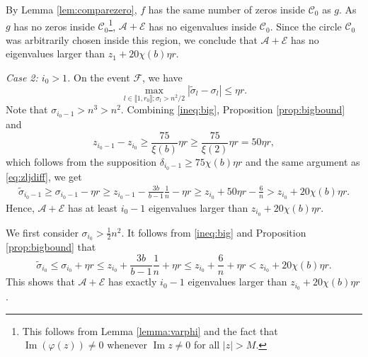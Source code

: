 \documentclass[reqno]{amsart}
\renewcommand\Im{\operatorname{Im}}
\theoremstyle{plain}
\theoremstyle{definition}
\begin{document}
By Lemma \ref{lem:comparezero}, $f$ has the same number of zeros inside $\mathcal{C}_0$ as $g$.  As $g$ has no zeros inside $\mathcal{C}_0$\footnote{This follows from Lemma \ref{lemma:varphi} and the fact that $\Im(\varphi(z)) \neq 0$ whenever $\Im z \neq 0$ for all $|z| > M$.}, $\mathcal A+\mathcal E$ has no eigenvalues inside $\mathcal{C}_0$.  Since the circle $\mathcal{C}_0$ was arbitrarily chosen inside this region, we conclude that $\mathcal A+\mathcal E$ has no eigenvalues larger than $z_1+20\chi(b)\eta r$.

\medskip

\noindent\emph{Case 2: $i_0>1$.} 
On the event $\mathcal F$, we have
\begin{equation}\label{ineq:big}
\max_{l\in \llbracket 1,r_0 \rrbracket; \sigma_l>n^2/2}|\widetilde \sigma_l - \sigma_l |\le \eta r.
\end{equation}
Note that $\sigma_{i_0-1}>n^3>n^2$.  Combining \eqref{ineq:big}, Proposition \ref{prop:bigbound} and $$z_{i_0-1} - z_{i_0}\ge \frac{75}{\xi(b)}\eta r\ge \frac{75}{\xi(2)}\eta r = 50\eta r,$$ which follows from the supposition $\delta_{i_0-1}\ge 75\chi(b) \eta r$ and the same argument as \eqref{eq:zljdiff}, we get 
\begin{align*}
\widetilde \sigma_{i_0-1} \ge \sigma_{i_0-1} - \eta r \ge z_{i_0-1} - \frac{3b}{b-1}\frac{1}{n} - \eta r \ge z_{i_0} + 50\eta r- \frac{6}{n} > z_{i_0} + 20\chi(b) \eta r.
\end{align*}
Hence, $\mathcal A+\mathcal E$ has at least $i_0-1$ eigenvalues larger than $z_{i_0}+20\chi(b)\eta r$. 

We first consider $\sigma_{i_0} >\frac{1}{2}n^2$.  It follows from \eqref{ineq:big} and Proposition \ref{prop:bigbound} that$$\widetilde \sigma_{i_0} \le \sigma_{i_0}+\eta r \le z_{i_0} + \frac{3b}{b-1}\frac{1}{n} +\eta r \le z_{i_0} +\frac{6}{n} +\eta r < z_{i_0} + 20\chi(b)\eta r.$$ This shows that $\mathcal A+\mathcal E$ has exactly $i_0-1$ eigenvalues larger than $z_{i_0}+20\chi(b)\eta r$. 
\end{document}
